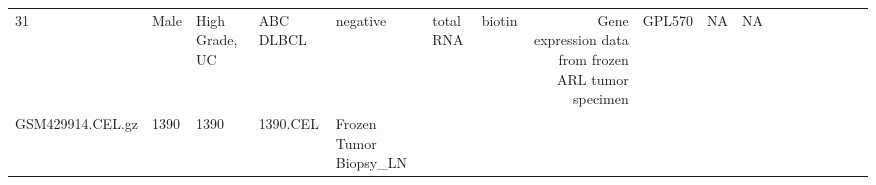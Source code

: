\documentclass[]{article}
\begin{document}
\begin{longtable}[]{@{}lllllllrllllllllll@{}}
\begin{minipage}[t]{0.05\columnwidth}
31\strut
\end{minipage} & \begin{minipage}[t]{0.04\columnwidth}\raggedright
Male\strut
\end{minipage} & \begin{minipage}[t]{0.06\columnwidth}\raggedright
High Grade, UC\strut
\end{minipage} & \begin{minipage}[t]{0.06\columnwidth}\raggedright
ABC DLBCL\strut
\end{minipage} & \begin{minipage}[t]{0.04\columnwidth}\raggedright
negative\strut
\end{minipage} & \begin{minipage}[t]{0.02\columnwidth}\raggedright
total RNA\strut
\end{minipage} & \begin{minipage}[t]{0.01\columnwidth}\raggedright
biotin\strut
\end{minipage} & \begin{minipage}[t]{0.08\columnwidth}\raggedright
Gene expression data from frozen ARL tumor specimen\strut
\end{minipage} & \begin{minipage}[t]{0.01\columnwidth}\raggedright
GPL570\strut
\end{minipage} & \begin{minipage}[t]{0.00\columnwidth}\raggedright
NA\strut
\end{minipage} & \begin{minipage}[t]{0.01\columnwidth}\raggedright
NA\strut
\end{minipage}\tabularnewline
\begin{minipage}[t]{0.03\columnwidth}\raggedright
GSM429914.CEL.gz\strut
\end{minipage} & \begin{minipage}[t]{0.02\columnwidth}\raggedright
1390\strut
\end{minipage} & \begin{minipage}[t]{0.01\columnwidth}\raggedright
1390\strut
\end{minipage} & \begin{minipage}[t]{0.02\columnwidth}\raggedright
1390.CEL\strut
\end{minipage} & \begin{minipage}[t]{0.06\columnwidth}\raggedright
Frozen Tumor Biopsy\_LN\strut
\end{minipage} & \begin{minipage}[t]{0.02\columnwidth}\raggedright

\end{minipage}
\end{longtable}
\end{document}
